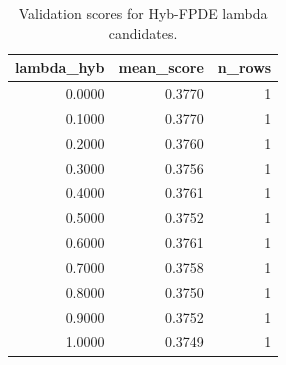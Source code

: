 \begin{table}[t]
\caption{Validation scores for Hyb-FPDE lambda candidates.}
\label{tab:lambda_distribution_computed}
\centering
\begin{tabular}{rrr}
\toprule
lambda\_hyb & mean\_score & n\_rows \\
\midrule
0.0000 & 0.3770 & 1 \\
0.1000 & 0.3770 & 1 \\
0.2000 & 0.3760 & 1 \\
0.3000 & 0.3756 & 1 \\
0.4000 & 0.3761 & 1 \\
0.5000 & 0.3752 & 1 \\
0.6000 & 0.3761 & 1 \\
0.7000 & 0.3758 & 1 \\
0.8000 & 0.3750 & 1 \\
0.9000 & 0.3752 & 1 \\
1.0000 & 0.3749 & 1 \\
\bottomrule
\end{tabular}

\end{table}
